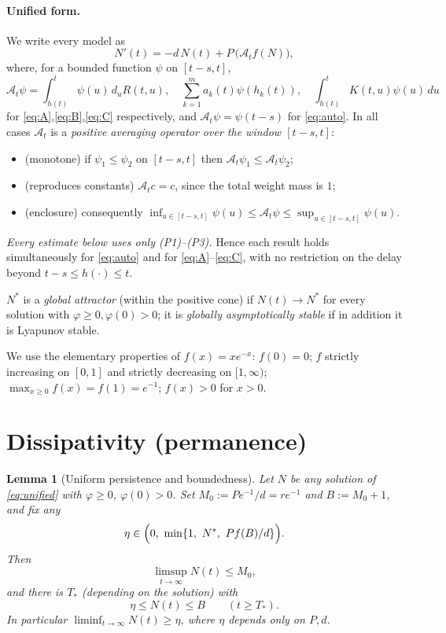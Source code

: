 \documentclass[12pt]{article}
\newtheorem{lemma}{Lemma}
\theoremstyle{definition}
\begin{document}
\paragraph{Unified form.}
We write every model as
\begin{equation}\label{eq:unified}
  N'(t)=-d\,N(t)+P\,\bigl(\mathcal A_t f(N)\bigr),
\end{equation}
where, for a bounded function $\psi$ on $[t-s,t]$,
\[
  \mathcal A_t\psi=\int_{h(t)}^{t}\psi(u)\,d_uR(t,u),\quad
  \sum_{k=1}^m a_k(t)\psi(h_k(t)),\quad
  \int_{h(t)}^{t}K(t,u)\psi(u)\,du
\]
for \eqref{eq:A},\eqref{eq:B},\eqref{eq:C} respectively, and
$\mathcal A_t\psi=\psi(t-s)$ for \eqref{eq:auto}. In all cases $\mathcal A_t$ is
a \emph{positive averaging operator over the window $[t-s,t]$}:
\begin{itemize}
\item[(P1)] (monotone) if $\psi_1\le\psi_2$ on $[t-s,t]$ then
  $\mathcal A_t\psi_1\le\mathcal A_t\psi_2$;
\item[(P2)] (reproduces constants) $\mathcal A_t c=c$, since the total weight
  mass is $1$;
\item[(P3)] (enclosure) consequently
  $\displaystyle\inf_{u\in[t-s,t]}\psi(u)\le\mathcal A_t\psi
  \le\sup_{u\in[t-s,t]}\psi(u)$.
\end{itemize}
\emph{Every estimate below uses only (P1)--(P3).} Hence each result holds
simultaneously for \eqref{eq:auto} and for \eqref{eq:A}--\eqref{eq:C}, with no
restriction on the delay beyond $t-s\le h(\cdot)\le t$.

$N^*$ is a \emph{global attractor} (within the positive cone) if
$N(t)\to N^*$ for every solution with $\varphi\ge0,\varphi(0)>0$; it is
\emph{globally asymptotically stable} if in addition it is Lyapunov stable.

We use the elementary properties of $f(x)=xe^{-x}$: $f(0)=0$; $f$ strictly
increasing on $[0,1]$ and strictly decreasing on $[1,\infty)$;
$\max_{x\ge0}f(x)=f(1)=e^{-1}$; $f(x)>0$ for $x>0$.

\section{Dissipativity (permanence)}

\begin{lemma}[Uniform persistence and boundedness]\label{lem:perm}
Let $N$ be any solution of \eqref{eq:unified} with $\varphi\ge0$,
$\varphi(0)>0$. Set $M_0:=Pe^{-1}/d=re^{-1}$ and $B:=M_0+1$, and fix any
\begin{equation}\label{eq:etachoice}
  \eta\in\Bigl(0,\ \min\{1,\ N^*,\ Pf(B)/d\}\Bigr).
\end{equation}
Then
\begin{equation}\label{eq:limsup}
  \limsup_{t\to\infty}N(t)\le M_0,
\end{equation}
and there is $T_*$ (depending on the solution) with
\begin{equation}\label{eq:trap}
  \eta\le N(t)\le B\qquad(t\ge T_*).
\end{equation}
In particular $\liminf_{t\to\infty}N(t)\ge\eta$, where $\eta$ depends only on
$P,d$.
\end{lemma}
\end{document}
